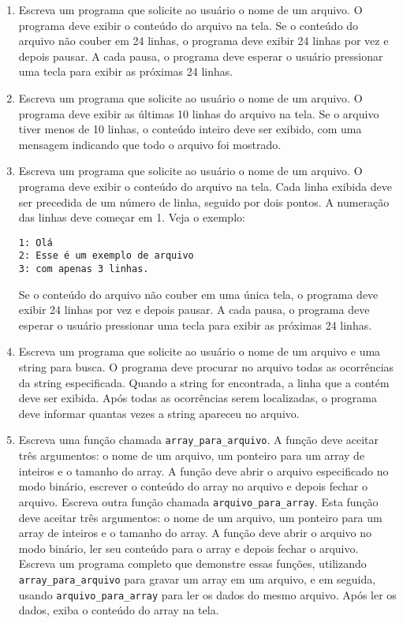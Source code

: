\documentclass[12pt]{article}
\begin{document}
\begin{enumerate}
  \item Escreva um programa que solicite ao usuário o nome de um arquivo. O programa deve exibir o conteúdo do arquivo na tela. Se o conteúdo do arquivo não couber em 24 linhas, o programa deve exibir 24 linhas por vez e depois pausar. A cada pausa, o programa deve esperar o usuário pressionar uma tecla para exibir as próximas 24 linhas.

  \item Escreva um programa que solicite ao usuário o nome de um arquivo. O programa deve exibir as últimas 10 linhas do arquivo na tela. Se o arquivo tiver menos de 10 linhas, o conteúdo inteiro deve ser exibido, com uma mensagem indicando que todo o arquivo foi mostrado.

  \item Escreva um programa que solicite ao usuário o nome de um arquivo. O programa deve exibir o conteúdo do arquivo na tela. Cada linha exibida deve ser precedida de um número de linha, seguido por dois pontos. A numeração das linhas deve começar em 1. Veja o exemplo:

  \texttt{1: Olá\\
  2: Esse é um exemplo de arquivo\\
  3: com apenas 3 linhas.}

  Se o conteúdo do arquivo não couber em uma única tela, o programa deve exibir 24 linhas por vez e depois pausar. A cada pausa, o programa deve esperar o usuário pressionar uma tecla para exibir as próximas 24 linhas.

  \item Escreva um programa que solicite ao usuário o nome de um arquivo e uma string para busca. O programa deve procurar no arquivo todas as ocorrências da string especificada. Quando a string for encontrada, a linha que a contém deve ser exibida. Após todas as ocorrências serem localizadas, o programa deve informar quantas vezes a string apareceu no arquivo.

  \item Escreva uma função chamada \texttt{array\_para\_arquivo}. A função deve aceitar três argumentos: o nome de um arquivo, um ponteiro para um array de inteiros e o tamanho do array. A função deve abrir o arquivo especificado no modo binário, escrever o conteúdo do array no arquivo e depois fechar o arquivo. Escreva outra função chamada \texttt{arquivo\_para\_array}. Esta função deve aceitar três argumentos: o nome de um arquivo, um ponteiro para um array de inteiros e o tamanho do array. A função deve abrir o arquivo no modo binário, ler seu conteúdo para o array e depois fechar o arquivo. Escreva um programa completo que demonstre essas funções, utilizando \texttt{array\_para\_arquivo} para gravar um array em um arquivo, e em seguida, usando \texttt{arquivo\_para\_array} para ler os dados do mesmo arquivo. Após ler os dados, exiba o conteúdo do array na tela.


\end{enumerate}
\end{document}

